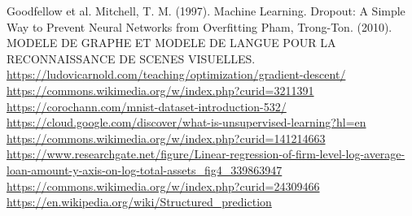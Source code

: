 \documentclass{beamer}
\begin{document}
\begin{thebibliography}{99}
    Goodfellow et al.
    Mitchell, T. M. (1997). Machine Learning.
    Dropout: A Simple Way to Prevent Neural Networks from Overfitting
    Pham, Trong-Ton. (2010). MODELE DE GRAPHE ET MODELE DE LANGUE POUR LA RECONNAISSANCE DE SCENES VISUELLES.
    \url{https://ludovicarnold.com/teaching/optimization/gradient-descent/}
    \url{https://commons.wikimedia.org/w/index.php?curid=3211391}
    \url{https://corochann.com/mnist-dataset-introduction-532/}
    \url{https://cloud.google.com/discover/what-is-unsupervised-learning?hl=en}
    \url{https://commons.wikimedia.org/w/index.php?curid=141214663}
    \url{https://www.researchgate.net/figure/Linear-regression-of-firm-level-log-average-loan-amount-y-axis-on-log-total-assets_fig4_339863947}
    \url{https://commons.wikimedia.org/w/index.php?curid=24309466}
    \url{https://en.wikipedia.org/wiki/Structured_prediction}
\end{thebibliography}
\end{document}
